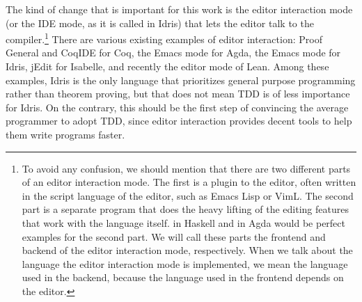 The kind of change that is important for this work is the editor
interaction mode (or the IDE mode, as it is called in Idris) that lets the editor
talk to the compiler.\footnote{To avoid any confusion, we should mention that
  there are two different parts of an editor interaction mode. The first is a
  plugin to the editor, often written in the script language of the editor,
  such as Emacs Lisp or VimL. The second part is a separate program that does
  the heavy lifting of the editing features that work with the language
  itself.   in Haskell and  in Agda would be
  perfect examples for the second part. We will call these parts the frontend
  and backend of the editor interaction mode, respectively.
  When we talk about the language the editor interaction mode is implemented,
  we mean the language used in the backend, because the language used in the
  frontend depends on the editor.}
There are various existing examples of editor interaction:
Proof General\cite{pg} and CoqIDE for Coq\cite{coq},
the Emacs mode\cite{agdamode} for Agda\cite{agda},
the Emacs mode\cite{idrismode} for Idris\cite{idris},
jEdit\cite{isabellejedit} for Isabelle,
and recently the editor mode of Lean\cite{lean}.
Among these examples, Idris is the only language that prioritizes general
purpose programming rather than theorem proving\cite{idrisfaq}, but that does
not mean TDD is of less importance for Idris. On the contrary, this should
be the first step of convincing the average programmer to adopt TDD, since
editor interaction provides decent tools to help them write programs faster.


